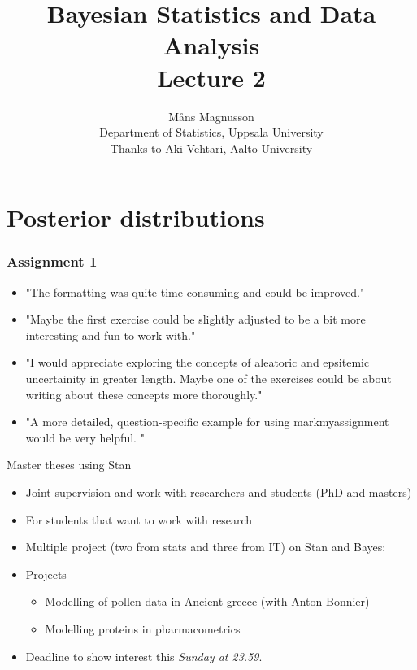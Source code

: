 \documentclass[10pt]{beamer}
\title[]{{\color{black}Bayesian Statistics and Data Analysis \\ Lecture 2}}
\author[]{M{\aa}ns Magnusson \\ Department of Statistics, Uppsala University \\ Thanks to Aki Vehtari, Aalto University}
\date{}
\begin{document}
\frame{\titlepage
}




\section{Posterior distributions}

\begin{frame}
  \frametitle{Assignment 1}

  \begin{itemize}
  \item "The formatting was quite time-consuming and could be improved."\pause
  \item "Maybe the first exercise could be slightly adjusted to be a bit more interesting and fun to work
with." \pause
  \item "I would appreciate exploring the concepts of aleatoric and
epsitemic uncertainity in greater length. Maybe one of the exercises could be about writing about
these concepts more thoroughly." \pause
\item "A more detailed, question-specific example for using markmyassignment would be very helpful. "
  \end{itemize}

\end{frame}


\begin{frame}{Master theses using Stan}

\begin{itemize}
\item Joint supervision and work with researchers and students (PhD and masters)
\item For students that want to work with research
\pause
\item Multiple project (two from stats and three from IT) on Stan and Bayes:
\pause
\item Projects
\begin{itemize}
\item Modelling of pollen data in Ancient greece (with Anton Bonnier)
\item Modelling proteins in pharmacometrics
\end{itemize}
\pause
\item Deadline to show interest this \emph{Sunday at 23.59}.
\end{itemize}
\end{frame}
\end{document}
